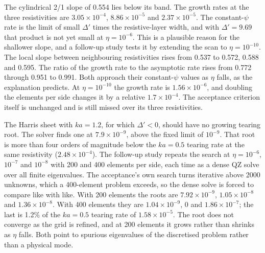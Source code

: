 \documentclass[11pt]{article}
\begin{document}
The cylindrical 2/1 slope of 0.554 lies below its band.  The growth rates at
the three resistivities are $3.05 \times 10^{-4}$, $8.86 \times 10^{-5}$ and
$2.37 \times 10^{-5}$.  The constant-$\psi$ rate is the limit of small
$\Delta'$ times the resistive-layer width, and with $\Delta' = 9.69$ that
product is not yet small at $\eta = 10^{-6}$.  This is a plausible reason for
the shallower slope, and a follow-up study tests it by extending the scan to
$\eta = 10^{-10}$.  The local slope between neighbouring resistivities rises
from 0.537 to 0.572, 0.588 and 0.595.  The ratio of the growth rate to the
asymptotic rate rises from 0.772 through 0.951 to 0.991.  Both approach their
constant-$\psi$ values as $\eta$ falls, as the explanation predicts.  At $\eta
= 10^{-10}$ the growth rate is $1.56 \times 10^{-6}$, and doubling the
elements per side changes it by a relative $1.7 \times 10^{-4}$.  The
acceptance criterion itself is unchanged and is still missed over its three
resistivities.

The Harris sheet with $ka = 1.2$, for which $\Delta' < 0$, should have no
growing tearing root.  The solver finds one at $7.9 \times 10^{-9}$, above the
fixed limit of $10^{-9}$.  That root is more than four orders of magnitude
below the $ka = 0.5$ tearing rate at the same resistivity ($2.48 \times
10^{-4}$).  The follow-up study repeats the search at $\eta = 10^{-6}$,
$10^{-7}$ and $10^{-8}$ with 200 and 400 elements per side, each time as a
dense QZ solve over all finite eigenvalues.  The acceptance's own search turns
iterative above 2000 unknowns, which a 400-element problem exceeds, so the
dense solve is forced to compare like with like.  With 200 elements the roots
are $7.92 \times 10^{-9}$, $1.05 \times 10^{-8}$ and $1.36 \times 10^{-8}$.
With 400 elements they are $1.04 \times 10^{-9}$, 0 and $1.86 \times
10^{-7}$; the last is 1.2\% of the $ka = 0.5$ tearing rate of $1.58 \times
10^{-5}$.  The root does not converge as the grid is refined, and at 200
elements it grows rather than shrinks as $\eta$ falls.  Both point to spurious
eigenvalues of the discretised problem rather than a physical mode.
\end{document}
